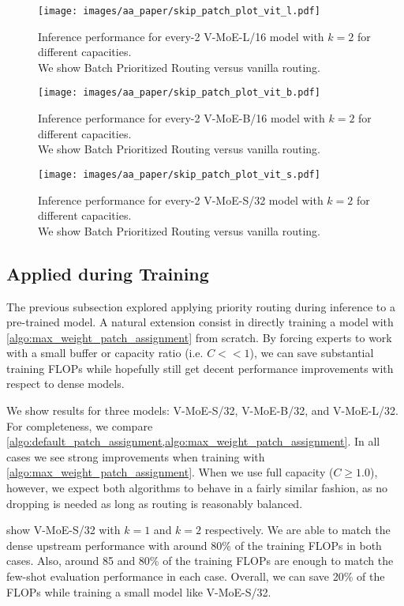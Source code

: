 \documentclass{article}
\newcommand{\abbv}{{V-MoE}}
\newcommand{\maxrouting}{Batch Prioritized Routing}
\begin{document}
\begin{figure}[h]
\centering
\texttt{[image: images/aa\_paper/skip\_patch\_plot\_vit\_l.pdf]}
\caption{Inference performance for every-2 V-MoE-L/16 model with $k=2$ for different capacities. \\
We show \maxrouting{} versus vanilla routing.}
\label{im:inference_c_vit_l}
\end{figure}

\begin{figure}[h]
\centering
\texttt{[image: images/aa\_paper/skip\_patch\_plot\_vit\_b.pdf]}
\caption{Inference performance for every-2 V-MoE-B/16 model with $k=2$ for different capacities. \\
We show \maxrouting{} versus vanilla routing.}
\label{im:inference_c_vit_b}
\end{figure}

\begin{figure}[h]
\centering
\texttt{[image: images/aa\_paper/skip\_patch\_plot\_vit\_s.pdf]}
\caption{Inference performance for every-2 V-MoE-S/32 model with $k=2$ for different capacities. \\
We show \maxrouting{} versus vanilla routing.}
\label{im:inference_c_vit_s}
\end{figure}

\clearpage
\subsection{Applied during Training}

The previous subsection explored applying priority routing during inference to a pre-trained model.
A natural extension consist in directly training a model with \cref{algo:max_weight_patch_assignment} from scratch.
By forcing experts to work with a small buffer or capacity ratio (i.e. $C << 1$), we can save substantial training FLOPs while hopefully still get decent performance improvements with respect to dense models.

We show results for three models: \abbv{}-S/32, \abbv{}-B/32, and \abbv{}-L/32.
For completeness, we compare \cref{algo:default_patch_assignment,algo:max_weight_patch_assignment}.
In all cases we see strong improvements when training with \cref{algo:max_weight_patch_assignment}.
When we use full capacity ($C \ge 1.0$), however, we expect both algorithms to behave in a fairly similar fashion, as no dropping is needed as long as routing is reasonably balanced.

 show \abbv{}-S/32 with $k=1$ and $k=2$ respectively.
We are able to match the dense upstream performance with around 80\% of the training FLOPs in both cases.
Also, around 85 and 80\% of the training FLOPs are enough to match the few-shot evaluation performance in each case.
Overall, we can save 20\% of the FLOPs while training a small model like \abbv{}-S/32.
\end{document}
